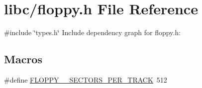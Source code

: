 \hypertarget{a00017}{}\section{libc/floppy.h File Reference}
\label{a00017}
{\ttfamily \#include \char`\"{}types.\+h\char`\"{}}\newline
Include dependency graph for floppy.\+h\+:
\subsection*{Macros}
\begin{DoxyCompactItemize}
\item 
\#define \hyperlink{a00017_a04d40064bde801f12fb73134cf328150_a04d40064bde801f12fb73134cf328150}{F\+L\+O\+P\+P\+Y\+\_\+\_\+\+S\+E\+C\+T\+O\+R\+S\+\_\+\+P\+E\+R\+\_\+\+T\+R\+A\+CK}~512
\end{DoxyCompactItemize}
